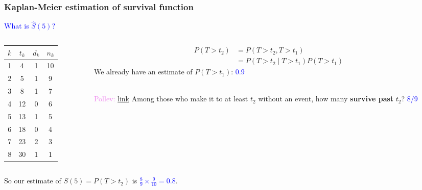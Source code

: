 \documentclass[10pt,t]{beamer}
\begin{document}
\begin{frame}
	\frametitle{Kaplan-Meier estimation of survival function}
	
		\vspace{-5 mm}
	
	\textcolor{blue}{What is $\widehat{S}(5)$?}
	
	\medskip
	
	\begin{columns}
		\begin{column}{0.3\textwidth}
			\begin{center}
				\begin{tabular}{|c|c|c|c|}
					\hline
					$k$ & $t_k$ & $d_k$ & $n_k$ \\
					\hline
					1 & 4 & 1 & 10 \\
					2& 5 & 1 & 9 \\
					3& 8 & 1 & 7 \\
					4&12 & 0 & 6 \\
					5&13 & 1 & 5 \\
					6&18 & 0 & 4 \\
					7&23 & 2 & 3 \\
					8&30 & 1 & 1 \\
					\hline
				\end{tabular}
			\end{center}
		\end{column}
		\begin{column}{0.7\textwidth}  %
			\begin{align*}
			P(T > t_2) &= P(T > t_2, T > t_1) \\
			&= P(T > t_2 \mid T > t_1)P(T > t_1)
			\end{align*}
				We already have an estimate of $P(T > t_1)$: \textcolor{blue}{0.9}  
			\\ ~\ 
			
			\textcolor{violet}{Pollev: \href{https://PollEv.com/free_text_polls/0ZMy8Tg91FRE7uYQeUDMl/respond}{link} }Among those who make it to at least $t_2$ without an event, how many \textbf{survive past} $t_2$? \pause   \textcolor{blue}{8/9} 
		\end{column}
	\end{columns}
	\vspace{0.5cm}
	So our estimate of $S(5) = P(T > t_2)$ is \textcolor{blue}{$\frac{8}{9} \times \frac{9}{10} = 0.8$}.
\end{frame}
\end{document}

